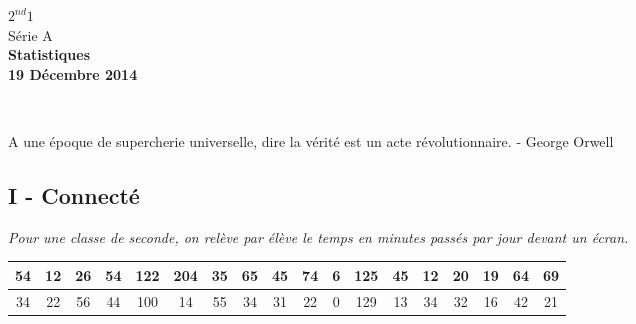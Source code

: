 \documentclass[11pt]{article}
\begin{document}

\begin{minipage}[t]{\textwidth}
  \raggedright
      {\bfseries $2^{nd}1$}\\[.35ex]
      Série A\\
      \vspace*{-1cm}
      \raggedleft
          {\bfseries Statistiques}\\[.35ex]
          {\bfseries 19 Décembre 2014}\\[.35ex]
\end{minipage}\\[1em]

\begin{center}
  \textsf{A une époque de supercherie universelle, dire la vérité est un acte révolutionnaire. - George Orwell}
\end{center}

\setlength{\columnseprule}{1pt}

\subsection*{I - Connecté}

\textit{Pour une classe de seconde, on relève par élève le temps en minutes passés par jour devant un écran.}

\begin{center}
  \begin{tabular}{| c | c | c | c | c | c | c | c | c | c | c | c | c | c | c | c | c | c | }
    \hline
    54 & 12 & 26 & 54 & 122 & 204 & 35 & 65 & 45 & 74 & 6 & 125 & 45 & 12 & 20 & 19 & 64 & 69 \\
    \hline
    34 & 22 & 56 & 44 & 100 & 14 & 55 & 34 & 31 & 22 & 0 & 129 & 13 & 34 & 32 & 16 & 42 & 21 \\
    \hline
  \end{tabular}
\end{center}
\end{document}
